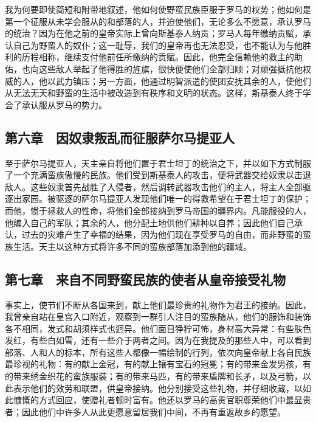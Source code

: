 我为何要即使简短和附带地叙述，他如何使野蛮民族臣服于罗马的权势；他如何是第一个征服从未学会服从的和部落的人，并迫使他们，无论多么不愿意，承认罗马的统治？因为在他之前的皇帝实际上曾向斯基泰人纳贡；罗马人每年缴纳贡赋，承认自己为野蛮人的奴仆；这一耻辱，我们的皇帝再也无法忍受，也不能认为与他胜利的历程相称，继续支付他前任所缴纳的贡赋。因此，他完全信赖他的救主的助佑，也向这些敌人举起了他得胜的旌旗，很快便使他们全部归顺；对顽强抵抗他权威的人，他以武力镇压；另一方面，他通过明智派遣的使团安抚其余的人，使他们从无法无天和野蛮的生活中被改造到有秩序和文明的状态。这样，斯基泰人终于学会了承认服从罗马的势力。\par


\subsection{第六章　因奴隶叛乱而征服萨尔马提亚人}

至于萨尔马提亚人，天主亲自将他们置于君士坦丁的统治之下，并以如下方式制服了一个充满蛮族傲慢的民族。他们受到斯基泰人的攻击，便将武器交给奴隶以击退敌人。这些奴隶首先战胜了入侵者，然后调转武器攻击他们的主人，将主人全部驱逐出家园。被驱逐的萨尔马提亚人发现他们唯一的得救希望在于君士坦丁的保护；而他，惯于拯救人的性命，将他们全部接纳到罗马帝国的疆界内。凡能服役的人，他编入自己的军队；其余的人，他分配土地供他们耕种以自养；因此他们自己承认，过去的灾难产生了幸福的结果，因为他们现在享受罗马的自由，而非野蛮的蛮族生活。天主以这种方式将许多不同的蛮族部落加添到他的疆域。\par


\subsection{第七章　来自不同野蛮民族的使者从皇帝接受礼物}

事实上，使节们不断从各国来到，献上他们最珍贵的礼物作为君王的接纳。因此，我曾亲自站在皇宫入口附近，观察到一群引人注目的蛮族随从，他们的服饰和装饰各不相同，发式和胡须样式也迥异。他们面目狰狞可怖，身材高大异常：有些肤色发红，有些白如雪，还有一些介于两者之间。因为在我提及的那些人中，可以看到部落、人和人的标本，所有这些人都像一幅绘制的行列，依次向皇帝献上各自民族最珍视的礼物：有的献上金冠，有的献上镶有宝石的冠冕；有的带来金发男孩，有的带来绣金织花的蛮族服装；有的带来马匹，有的带来盾牌和长矛，以及弓箭，以此表示他们的效劳和联盟，供皇帝接纳。他分别接受这些礼物，并仔细收藏，以如此慷慨的方式回应，使赠礼者顿时富有。他还以罗马的高贵官职尊荣他们中最显贵者；因此他们中许多人从此更愿意留居我们中间，不再有重返故乡的愿望。\par

